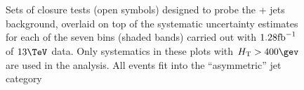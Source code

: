 \begin{figure}[h!]
  \begin{center}
     ~~
     \\
     ~~
     \\
    \caption{Sets of closure tests (open symbols) designed to probe
      the \znunu + jets background, overlaid on top of
      the systematic uncertainty estimates for each of the seven
      \scalht bins (shaded bands) carried out with $1.28\text{fb}^{-1}$ of
      $13\tev$ data. Only systematics in these plots with
      $\scalht>400\gev$ are used in the analysis. All events fit 
      into the ``asymmetric'' jet
      category}
    \label{fig:ZinvclosureDataAsymgt400}
  \end{center} 
\end{figure}



